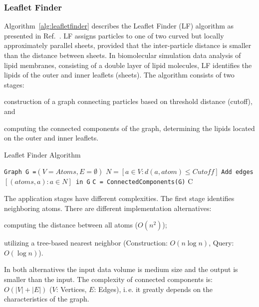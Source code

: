 \subsubsection*{Leaflet Finder}Algorithm~\ref{alg:leafletfinder} describes the Leaflet Finder (LF) algorithm as presented in Ref.~\cite{michaud2011mdanalysis}.
LF assigns particles to one of two curved but locally approximately parallel sheets, provided that the inter-particle distance is smaller than the distance between sheets.
In biomolecular simulation data analysis of lipid membranes, consisting of a double layer of lipid molecules, LF identifies the lipids of the outer and inner leaflets (sheets).
The algorithm consists of two stages:
\begin{inparaenum}[a)]
    \item construction of a graph connecting particles based on threshold distance (cutoff), and
    \item computing the connected components of the graph, determining the lipids located on the outer and inner leaflets.
\end{inparaenum}

\begin{algorithm}[t]
    \scriptsize
    \caption{Leaflet Finder Algorithm}
    \label{alg:leafletfinder}
    \begin{algorithmic}[1]
        \State \texttt{Graph G =$(V=Atoms,E=\emptyset)$}
        \State \texttt{$N = [a\in V: d(a,atom)\le Cutoff]$}
        \State \texttt{Add edges $[(atoms,a): a \in N]$ in G}
        \EndFor
        \State \texttt{C = ConnectedComponents(G)}
        \State \Return C
        \EndProcedure
    \end{algorithmic}
\end{algorithm}

The application stages have different complexities.
The first stage identifies neighboring atoms.
There are different implementation alternatives: 
\begin{inparaenum}[i)]
    \item computing the distance between all atoms ($O(n^2)$);
    \item utilizing a tree-based nearest neighbor (Construction: $O(n\log n)$, 
    Query: $O(\log n)$).
\end{inparaenum}
In both alternatives the input data volume is medium size and the output is smaller than the input.
The complexity of connected components is: $O(|V|+|E|)$ ($V$: Vertices, $E$: Edges), i.\,e. it greatly depends on the characteristics of the graph.


